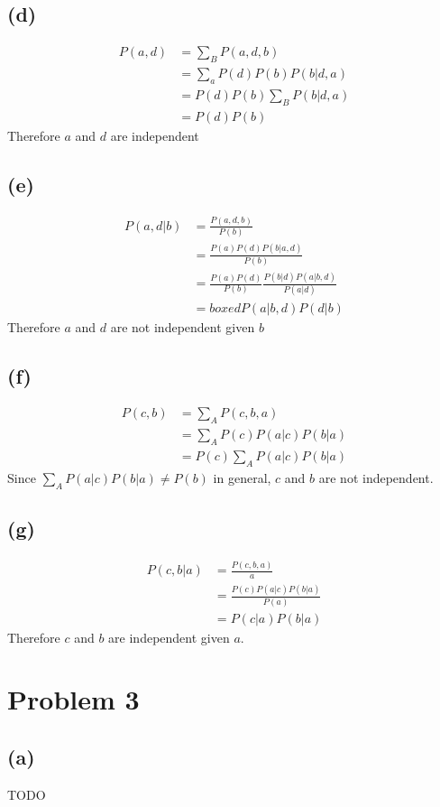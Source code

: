 \documentclass[12pt]{article}
\begin{document}
\subsection*{(d)}
\begin{align*}
   P(a,d)&= \sum_{B}P(a,d,b)\\
   &=\sum_{a}P(d)P(b)P(b|d,a)\\
   &=P(d)P(b)\sum_{B}P(b|d,a)\\
   &=P(d)P(b)
\end{align*}
Therefore $a$ and $d$ are independent
\subsection*{(e)}
\begin{align*}
    P(a,d|b)&= \frac{P(a,d,b)}{P(b)}\\
    &=\frac{P(a)P(d)P(b|a,d)}{P(b)}\\
    &=\frac{P(a)P(d)}{P(b)}\frac{P(b|d)P(a|b,d)}{P(a|d)}\\
    &=boxed{P(a|b,d)P(d|b)}
 \end{align*}
 Therefore $a$ and $d$ are not independent given $b$
 \subsection*{(f)}
 \begin{align*}
    P(c,b)&=  \sum_{A}P(c,b,a)\\
    &=\sum_{A}P(c)P(a|c)P(b|a)\\
    &=P(c)\sum_{A}P(a|c)P(b|a)
 \end{align*}
 Since $\sum_{A}P(a|c)P(b|a)\neq P(b)$ in general, $c$ and $b$ are not independent.
 \subsection*{(g)}
 \begin{align*}
    P(c,b|a)&=  \frac{P(c,b,a)}{a}\\
    &=\frac{P(c)P(a|c)P(b|a)}{P(a)}\\
    &=P(c|a)P(b|a)
 \end{align*}
 Therefore $c$ and $b$ are independent given $a$.
\section*{Problem 3}
\subsection*{(a)}
TODO
\end{document}
